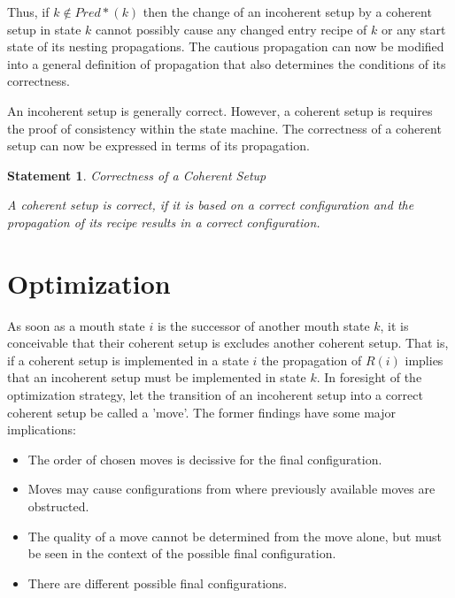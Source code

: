 \documentclass[12pt,a4paper]{scrartcl}
\newtheorem{statement}{Statement}
\begin{document}
Thus, if $k\notin Pred*(k)$  then the change of an incoherent setup by a
coherent setup in state $k$ cannot possibly cause any changed entry recipe
of $k$ or any start state of its nesting propagations. The cautious propagation
can now be modified into a general definition of propagation that also
determines the conditions of its correctness.

An incoherent setup is generally correct. However, a coherent setup is requires
the proof of consistency within the state machine. The correctness of a
coherent setup can now be expressed in terms of its propagation.

\begin{statement} Correctness of a Coherent Setup

    A coherent setup is correct, if it is based on a correct configuration and 
    the propagation of its recipe results in a correct configuration.
    
\end{statement}



\section{Optimization}

As soon as a mouth state $i$ is the successor of another mouth state $k$, it is
conceivable that their coherent setup is excludes another coherent setup. That
is, if a coherent setup is implemented in a state $i$ the propagation of $R(i)$
implies that an incoherent setup must be implemented in state $k$.  In
foresight of the optimization strategy, let the transition of an incoherent
setup into a correct coherent setup be called a 'move'.  The former findings
have some major implications:

\begin{itemize}
    \item The order of chosen moves is decissive for the final configuration.

    \item Moves may cause configurations from where previously available 
          moves are obstructed.

    \item The quality of a move cannot be determined from the move alone, but
          must be seen in the context of the possible final configuration.

    \item There are different possible final configurations.
          
\end{itemize}
\end{document}
